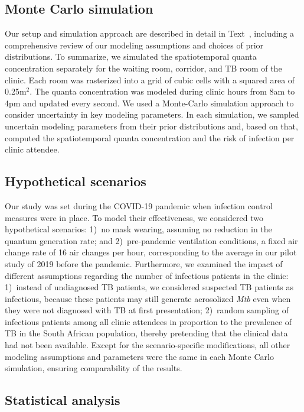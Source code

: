 \documentclass[fleqn,11pt]{wlscirep}
\begin{document}
\subsection{Monte Carlo simulation}

Our setup and simulation approach are described in detail in Text~, including a comprehensive review of our modeling assumptions and choices of prior distributions. To summarize, we simulated the spatiotemporal quanta concentration separately for the waiting room, corridor, and TB room of the clinic. Each room was rasterized into a grid of cubic cells with a squared area of 0.25m$^2$. The quanta concentration was modeled during clinic hours from 8am to 4pm and updated every second. We used a Monte-Carlo simulation approach to consider uncertainty in key modeling parameters. In each simulation, we sampled uncertain modeling parameters from their prior distributions and, based on that, computed the spatiotemporal quanta concentration and the risk of infection per clinic attendee. 

\subsection{Hypothetical scenarios}

Our study was set during the COVID-19 pandemic when infection control measures were in place. To model their effectiveness, we considered two hypothetical scenarios: 1)~no mask wearing, \ie assuming no reduction in the quantum generation rate; and 2)~pre-pandemic ventilation conditions, \ie a fixed air change rate of 16 air changes per hour, corresponding to the average in our pilot study of 2019 before the pandemic\cite{Zurcher2022JID}. Furthermore, we examined the impact of different assumptions regarding the number of infectious patients in the clinic: 1)~instead of undiagnosed TB patients, we considered suspected TB patients as infectious, because these patients may still generate aerosolized \emph{Mtb} even when they were not diagnosed with TB at first presentation\cite{Patterson2024PNAS}; 2)~random sampling of infectious patients among all clinic attendees in proportion to the prevalence of TB in the South African population\cite{Moyo2022LancetID}, thereby pretending that the clinical data had not been available. Except for the scenario-specific modifications, all other modeling assumptions and parameters were the same in each Monte Carlo simulation, ensuring comparability of the results. 

\subsection{Statistical analysis}
\end{document}
